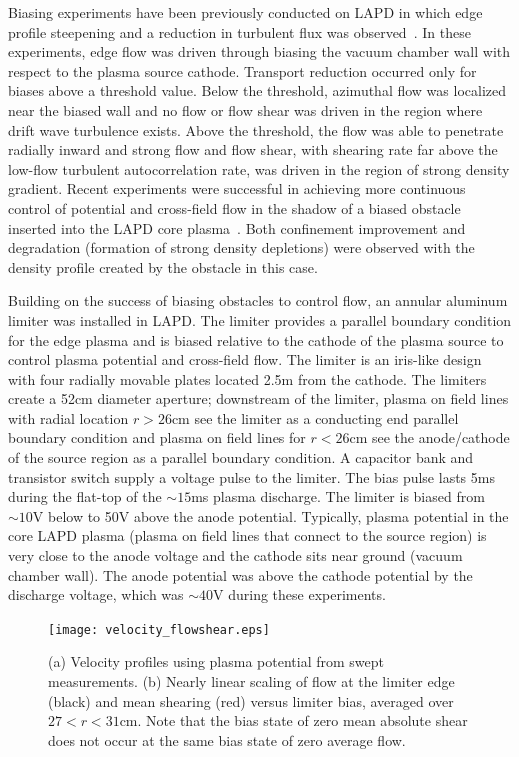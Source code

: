 \documentclass[aps,prl,amsmath,amssymb,reprint,superscriptaddress]{revtex4-1} %
\begin{document}
Biasing experiments have been previously conducted on LAPD in which
edge profile steepening and a reduction in turbulent flux was
observed~\cite{maggs07,carter09}. In these experiments, edge flow was
driven through biasing the vacuum chamber wall with respect to the
plasma source cathode.  Transport reduction occurred only for biases
above a threshold value.  Below the threshold, azimuthal flow was
localized near the biased wall and no flow or flow shear was driven in
the region where drift wave turbulence exists.  Above the threshold,
the flow was able to penetrate radially inward and strong flow and
flow shear, with shearing rate far above the low-flow turbulent
autocorrelation rate, was driven in the region of strong density
gradient.   Recent experiments were successful in achieving more continuous control of potential and cross-field flow in the shadow of a biased obstacle inserted into the LAPD core plasma~\cite{zhou12}.  Both confinement improvement and degradation (formation of strong density depletions) were observed with the density profile created by the obstacle in this case.  

Building on the success of biasing obstacles to control flow, an
annular aluminum limiter was installed in LAPD. The limiter provides a parallel boundary condition for the edge plasma and is biased relative to the cathode of the plasma source to control plasma potential and cross-field flow.  The limiter is
an iris-like design with four radially movable plates located 2.5m from
the cathode.  The limiters create a 52cm diameter aperture; downstream of the
limiter, plasma on field lines with radial location $r>26$cm see the
limiter as a conducting end parallel boundary condition and plasma on field
lines for $r<26$cm see the anode/cathode of the source region as a
parallel boundary condition.  A capacitor bank and transistor switch supply a voltage pulse to the limiter.  The
bias pulse lasts 5ms during the flat-top of the $\sim 15$ms plasma
discharge. The limiter is biased from $\sim 10$V below to 50V above the anode potential.  Typically, plasma potential
in the core LAPD plasma (plasma on field lines that connect to the
source region) is very close to the anode voltage and the cathode sits
near ground (vacuum chamber wall).  The anode potential was above the
cathode potential by the discharge voltage, which was $\sim 40$V during these experiments.

\begin{figure}[!htbp]
\centerline{
\texttt{[image: velocity\_flowshear.eps]}}
\caption{\label{fig:velocity_flowshear} (a) Velocity profiles using plasma potential from swept measurements. (b) Nearly linear scaling of flow at the limiter edge (black) and mean shearing (red) versus limiter bias, averaged over $27 < r < 31$cm. Note that the bias state of zero mean absolute shear does not occur at the same bias state of zero average flow.}
\end{figure}
\end{document}
